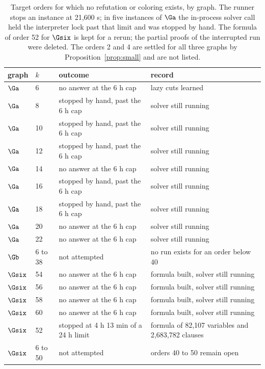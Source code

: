 \begin{table}[tbp]\centering\small
\begin{tabular}{ll>{\raggedright\arraybackslash}p{5.2cm}>{\raggedright\arraybackslash}p{5.6cm}}
\toprule
graph & $k$ & outcome & record\\
\midrule
$\Ga$ & 6 & no answer at the 6 h cap & 25 lazy cuts learned \\
$\Ga$ & 8 & stopped by hand, past the 6 h cap & solver still running \\
$\Ga$ & 10 & stopped by hand, past the 6 h cap & solver still running \\
$\Ga$ & 12 & stopped by hand, past the 6 h cap & solver still running \\
$\Ga$ & 14 & no answer at the 6 h cap & solver still running \\
$\Ga$ & 16 & stopped by hand, past the 6 h cap & solver still running \\
$\Ga$ & 18 & stopped by hand, past the 6 h cap & solver still running \\
$\Ga$ & 20 & no answer at the 6 h cap & solver still running \\
$\Ga$ & 22 & no answer at the 6 h cap & solver still running \\
\midrule
$\Gb$ & 6 to 38 & not attempted & no run exists for an order below 40 \\
\midrule
$\Gsix$ & 54 & no answer at the 6 h cap & formula built, solver still running \\
$\Gsix$ & 56 & no answer at the 6 h cap & formula built, solver still running \\
$\Gsix$ & 58 & no answer at the 6 h cap & formula built, solver still running \\
$\Gsix$ & 60 & no answer at the 6 h cap & formula built, solver still running \\
$\Gsix$ & 52 & stopped at 4 h 13 min of a 24 h limit & formula of 82{,}107 variables and 2{,}683{,}782 clauses \\
$\Gsix$ & 6 to 50 & not attempted & orders 40 to 50 remain open \\
\bottomrule
\end{tabular}
\caption{Target orders for which no refutation or coloring exists, by graph. The runner stops an instance at 21,600 s; in five instances of \(\Ga\) the in-process solver call held the interpreter lock past that limit and was stopped by hand. The formula of order 52 for \(\Gsix\) is kept for a rerun; the partial proofs of the interrupted run were deleted. The orders 2 and 4 are settled for all three graphs by Proposition~\ref{prop:small} and are not listed.}\label{tab:undecided}
\end{table}
